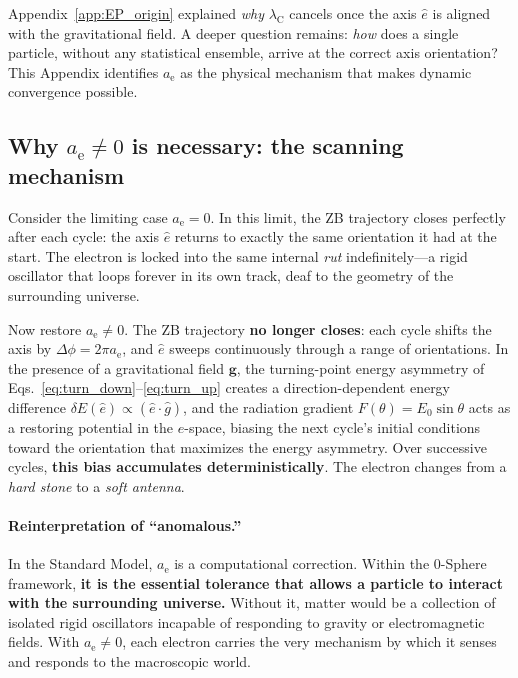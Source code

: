 \documentclass[%
 reprint, amsmath,amssymb, aps, prb, ]{revtex4-2}
\numberwithin{equation}{section}
\newcommand{\iphase}{\theta}
\newcommand{\lambdaC}{\lambda_{\mathrm{C}}}
\newcommand{\anom}{a_{\mathrm{e}}}
\begin{document}
Appendix~\ref{app:EP_origin} explained \emph{why} $\lambdaC$ cancels once the axis $\hat{e}$ is aligned with the gravitational field. A deeper question remains: \emph{how} does a single particle, without any statistical ensemble, arrive at the correct axis orientation? This Appendix identifies $\anom$ as the physical mechanism that makes dynamic convergence possible.

\subsection{Why $\anom \neq 0$ is necessary: the scanning mechanism}

Consider the limiting case $\anom = 0$. In this limit, the ZB trajectory closes perfectly after each cycle: the axis $\hat{e}$ returns to exactly the same orientation it had at the start. The electron is locked into the same internal \emph{rut} indefinitely---a rigid oscillator that loops forever in its own track, deaf to the geometry of the surrounding universe.

Now restore $\anom \neq 0$. The ZB trajectory \textbf{no longer closes}: each cycle shifts the axis by $\Delta\phi = 2\pi\anom$, and $\hat{e}$ sweeps continuously through a range of orientations. In the presence of a gravitational field $\mathbf{g}$, the turning-point energy asymmetry of Eqs.~\eqref{eq:turn_down}--\eqref{eq:turn_up} creates a direction-dependent energy difference $\delta E(\hat{e}) \propto (\hat{e}\cdot\hat{g})$, and the radiation gradient $F(\iphase) = E_0\sin\iphase$ acts as a restoring potential in the $\hat{e}$-space, biasing the next cycle's initial conditions toward the orientation that maximizes the energy asymmetry. Over successive cycles, \textbf{this bias accumulates deterministically}. The electron changes from a \emph{hard stone} to a \emph{soft antenna}.

\paragraph{Reinterpretation of ``anomalous.''}
In the Standard Model, $\anom$ is a computational correction. Within the 0-Sphere framework, \textbf{it is the essential tolerance that allows a particle to interact with the surrounding universe.} Without it, matter would be a collection of isolated rigid oscillators incapable of responding to gravity or electromagnetic fields. With $\anom \neq 0$, each electron carries the very mechanism by which it senses and responds to the macroscopic world.
\end{document}
